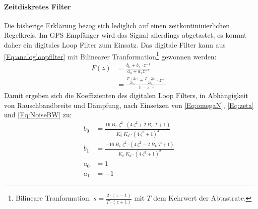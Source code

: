 \paragraph{Zeitdiskretes Filter}
Die bisherige Erklärung bezog sich lediglich auf einen zeitkontiniuierlichen Regelkreis. Im GPS Empfänger wird das Signal allerdings abgetastet, es kommt daher ein digitales Loop Filter zum Einsatz. Das digitale Filter kann aus \eqref{Eq:analogloopfilter} mit Bilinearer Tranformation\footnote{Bilineare Tranformation: $s=\frac{2\cdot(z-1)}{T\cdot(z+1)}$ mit $T$ dem Kehrwert der Abtastrate.} gewonnen werden:
\begin{align}
    F(z) &= \frac{b_0+b_1 \cdot z^{-1}}{a_0 + a_1 z^{-1}}\\
         &= \frac{\frac{T+2\tau_2}{2 \tau_1}+\frac{T+2\tau_2}{2 \tau_1} \cdot z^{-1}}{1-z^{-1}}
\end{align}
Damit ergeben sich die Koeffizienten des digitalen Loop Filters, in Abhängigkeit von Rauschbandbreite und Dämpfung, nach Einsetzen von \eqref{Eq:omegaN},  \eqref{Eq:zeta} und \eqref{Eq:NoiseBW} zu:
\begin{align}
    b_0 &= \frac{16 ~B_L ~\zeta^2\cdot(4~\zeta^2+2 ~B_L~ T + 1)}{K_0 ~K_d \cdot (4 ~\zeta^2+1)^2} \label{Eq:FilterB0}\\
    b_1 &= \frac{-16 ~B_L ~\zeta^2\cdot(4~\zeta^2-2 ~B_L~ T + 1)}{K_0 ~K_d \cdot (4 ~\zeta^2+1)^2} \label{Eq:FilterB1}\\
    a_0 &= 1 \label{Eq:FilterA0}\\
    a_1 &= -1 \label{Eq:FilterA1}
\end{align}
